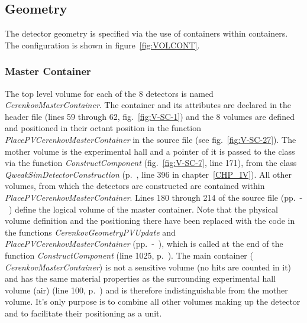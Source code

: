 \subsection{Geometry}

The detector geometry is specified via the use of containers within
containers. The configuration is shown in figure~\ref{fig:VOLCONT}.

\subsubsection{Master Container}

The top level volume for each of the 8 detectors is named {\it
CerenkovMasterContainer}. The container and its attributes are
declared in the header file (lines 59 through 62,
fig.~\ref{fig:V-SC-1}) and the 8 volumes are defined and positioned in
their octant position in the function {\it
PlacePVCerenkovMasterContainer} in the source file (see
fig.~\ref{fig:V-SC-27}). The mother volume is the experimental hall
and a pointer of it is passed to the class via the function {\it
ConstructComponent} (fig.~\ref{fig:V-SC-7}, line 171), from the class
{\it QweakSimDetectorConstruction}
(p.~\pageref{QweakSimDetectorConstruction}, line 396 in
chapter~\ref{CHP_IV}). All other volumes, from which the detectors are
constructed are contained within {\it PlacePVCerenkovMasterContainer}.
Lines 180 through 214 of the source file
(pp.~\pageref{SourceV7}-~\pageref{SourceV8}) define the logical volume
of the master container. Note that the physical volume definition and
the positioning there have been replaced with the code in the
functions {\it CerenkovGeometryPVUpdate} and {\it
PlacePVCerenkovMasterContainer}
(pp.~\pageref{SourceV22}-~\pageref{SourceV23}), which is called at the
end of the function {\it ConstructComponent} (line 1025,
p.~\pageref{SourceV17}). The main container ({\it
CerenkovMasterContainer}) is not a sensitive volume (no hits are
counted in it) and has the same material properties as the surrounding
experimental hall volume (air) (line 100, p.~\pageref{SourceV2}) and is
therefore indistinguishable from the mother volume. It's only purpose
is to combine all other volumes making up the detector and to
facilitate their positioning as a unit. 

